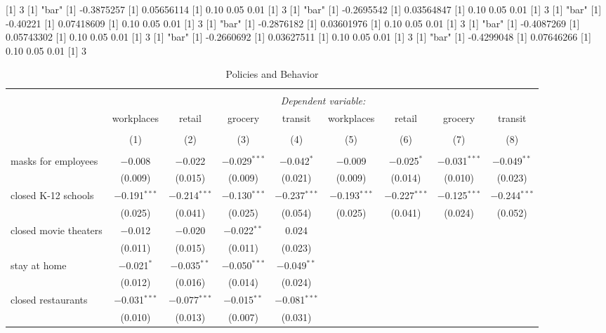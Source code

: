 [1] 3
[1] "bar"
[1] -0.3875257
[1] 0.05656114
[1] 0.10 0.05 0.01
[1] 3
[1] "bar"
[1] -0.2695542
[1] 0.03564847
[1] 0.10 0.05 0.01
[1] 3
[1] "bar"
[1] -0.40221
[1] 0.07418609
[1] 0.10 0.05 0.01
[1] 3
[1] "bar"
[1] -0.2876182
[1] 0.03601976
[1] 0.10 0.05 0.01
[1] 3
[1] "bar"
[1] -0.4087269
[1] 0.05743302
[1] 0.10 0.05 0.01
[1] 3
[1] "bar"
[1] -0.2660692
[1] 0.03627511
[1] 0.10 0.05 0.01
[1] 3
[1] "bar"
[1] -0.4299048
[1] 0.07646266
[1] 0.10 0.05 0.01
[1] 3

\begin{table}[!htbp] \centering 
  \caption{Policies and Behavior} 
  \label{} 
\begin{tabular}{@{\extracolsep{1pt}}lcccccccc} 
\\[-1.8ex]\hline 
\hline \\[-1.8ex] 
 & \multicolumn{8}{c}{\textit{Dependent variable:}} \\ 
\cline{2-9} 
 & workplaces & retail & grocery & transit & workplaces & retail & grocery & transit \\ 
\\[-1.8ex] & (1) & (2) & (3) & (4) & (5) & (6) & (7) & (8)\\ 
\hline \\[-1.8ex] 
 masks for employees & $-$0.008 & $-$0.022 & $-$0.029$^{***}$ & $-$0.042$^{*}$ & $-$0.009 & $-$0.025$^{*}$ & $-$0.031$^{***}$ & $-$0.049$^{**}$ \\ 
  & (0.009) & (0.015) & (0.009) & (0.021) & (0.009) & (0.014) & (0.010) & (0.023) \\ 
  closed K-12 schools & $-$0.191$^{***}$ & $-$0.214$^{***}$ & $-$0.130$^{***}$ & $-$0.237$^{***}$ & $-$0.193$^{***}$ & $-$0.227$^{***}$ & $-$0.125$^{***}$ & $-$0.244$^{***}$ \\ 
  & (0.025) & (0.041) & (0.025) & (0.054) & (0.025) & (0.041) & (0.024) & (0.052) \\ 
  closed movie theaters & $-$0.012 & $-$0.020 & $-$0.022$^{**}$ & 0.024 &  &  &  &  \\ 
  & (0.011) & (0.015) & (0.011) & (0.023) &  &  &  &  \\ 
  stay at home & $-$0.021$^{*}$ & $-$0.035$^{**}$ & $-$0.050$^{***}$ & $-$0.049$^{**}$ &  &  &  &  \\ 
  & (0.012) & (0.016) & (0.014) & (0.024) &  &  &  &  \\ 
  closed restaurants & $-$0.031$^{***}$ & $-$0.077$^{***}$ & $-$0.015$^{**}$ & $-$0.081$^{***}$ &  &  &  &  \\ 
  & (0.010) & (0.013) & (0.007) & (0.031) &  &  &  &  \\ 

\end{tabular}
\end{table}
